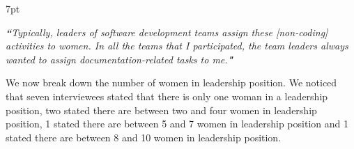 \documentclass{IEEEcsmag}
\newenvironment{formal}{%
  \def\FrameCommand{%
    \hspace{1pt}%
    {\color{formalshade}\vrule width 2pt}%
    {\color{formalshade}\vrule width 4pt}%
    \colorbox{formalshade}%
  }%
  \MakeFramed{\advance\hsize-\width\FrameRestore}%
  \noindent\hspace{-4.55pt}%
  \begin{adjustwidth}{}{7pt}%
  \vspace{2pt}\vspace{2pt}%
}
{%
  \vspace{2pt}\end{adjustwidth}\endMakeFramed%
}
\begin{document}
\begin{formal}
\emph{{\bf``}Typically, leaders of software development teams assign these [non-coding] activities to women. In all the teams that I participated, the team leaders always wanted to assign documentation-related tasks to me.{\bf"}}
\end{formal}


We now break down the number of women in leadership position. We noticed that seven interviewees stated that there is only one woman in a leadership position, two stated there are between two and four women in leadership position, 1 stated there are between 5 and 7 women in leadership position and 1 stated there are between 8 and 10 women in leadership position. 

\end{document}
